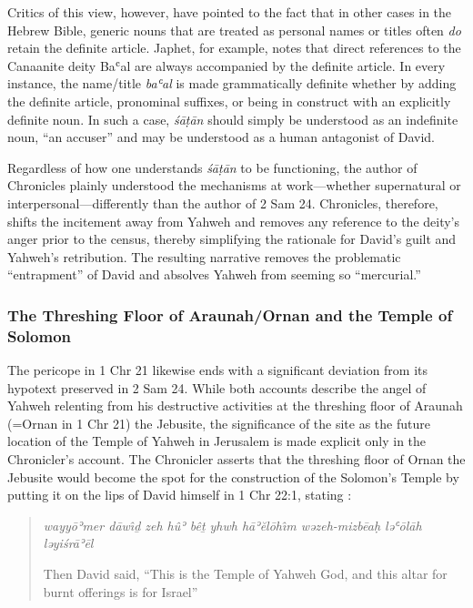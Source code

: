 Critics of this view, however, have pointed to the fact that in other
cases in the Hebrew Bible, generic nouns that are treated as personal
names or titles often \emph{do} retain the definite
article.\autocites[114--117]{japhet2009}[370--390]{japhet1993} Japhet,
for example, notes that direct references to the Canaanite deity Baʿal
are always accompanied by the definite article. In every instance, the
name/title \emph{baʿal} is made grammatically definite whether by adding
the definite article, pronominal suffixes, or being in construct with an
explicitly definite noun.\autocites[115]{japhet2009}[citing][§126d]{gkc}
In such a case, \emph{śāṭān} should simply be understood as an
indefinite noun, ``an accuser'' and may be understood as a human
antagonist of
David.\autocites{stokes_jbl2009}[114--117]{japhet2009}[370--390]{japhet1993}

Regardless of how one understands \emph{śāṭān} to be functioning, the
author of Chronicles plainly understood the mechanisms at work---whether
supernatural or interpersonal---differently than the author of 2 Sam 24.
Chronicles, therefore, shifts the incitement away from Yahweh and
removes any reference to the deity's anger prior to the census, thereby
simplifying the rationale for David's guilt and Yahweh's retribution.
The resulting narrative removes the problematic ``entrapment'' of David
and absolves Yahweh from seeming so ``mercurial.''
\autocite[4]{rollston_keith-stuckenbruck2016}

\subsubsection{The Threshing Floor of Araunah/Ornan and the Temple of
Solomon}\label{the-threshing-floor-of-araunahornan-and-the-temple-of-solomon}

The pericope in 1 Chr 21 likewise ends with a significant deviation from
its hypotext preserved in 2 Sam 24. While both accounts describe the
angel of Yahweh relenting from his destructive activities at the
threshing floor of Araunah (=Ornan in 1 Chr 21) the Jebusite, the
significance of the site as the future location of the Temple of Yahweh
in Jerusalem is made explicit only in the Chronicler's account. The
Chronicler asserts that the threshing floor of Ornan the Jebusite would
become the spot for the construction of the Solomon's Temple by putting
it on the lips of David himself in 1 Chr 22:1, stating :

\begin{quote}
\emph{wayyōʾmer dāwı̂ḏ zeh hûʾ bêṯ yhwh hāʾĕlōhı̂m wəzeh-mizbēaḥ ləʿōlāh
ləyiśrāʾēl}

Then David said, ``This is the Temple of Yahweh God, and this altar for
burnt offerings is for Israel''
\end{quote}

